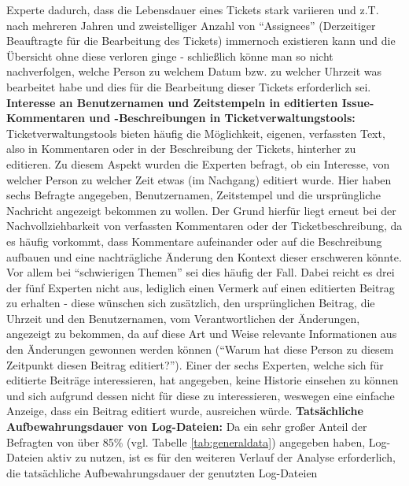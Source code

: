 Experte dadurch, dass die Lebensdauer eines Tickets stark variieren und z.T. nach mehreren Jahren und zweistelliger Anzahl von \enquote{Assignees} (Derzeitiger Beauftragte für die Bearbeitung des Tickets) immernoch existieren kann und die Übersicht ohne diese verloren ginge - schließlich könne man so nicht nachverfolgen, welche Person zu welchem Datum bzw. zu welcher Uhrzeit 
was bearbeitet habe und dies für die Bearbeitung dieser Tickets erforderlich sei. \newline \newline
\textbf{Interesse an Benutzernamen und Zeitstempeln in editierten Issue-Kommentaren und -Beschreibungen in Ticketverwaltungstools:} \newline
Ticketverwaltungstools bieten häufig die Möglichkeit, eigenen, verfassten Text, also in Kommentaren oder in der Beschreibung der Tickets, hinterher zu editieren. Zu diesem Aspekt wurden die Experten befragt, ob ein Interesse, von welcher Person zu welcher Zeit etwas (im Nachgang) editiert wurde. Hier haben sechs Befragte angegeben, Benutzernamen, Zeitstempel und die ursprüngliche Nachricht
angezeigt bekommen zu wollen. Der Grund hierfür liegt erneut bei der Nachvollziehbarkeit von verfassten Kommentaren oder der Ticketbeschreibung, da es häufig vorkommt, dass Kommentare aufeinander oder auf die Beschreibung aufbauen und eine nachträgliche Änderung den Kontext dieser erschweren könnte. Vor allem bei \enquote{schwierigen Themen} sei dies häufig der Fall. Dabei reicht es drei der
fünf Experten nicht aus, lediglich einen Vermerk auf einen editierten Beitrag zu erhalten - diese wünschen sich zusätzlich, den ursprünglichen Beitrag, die Uhrzeit und den Benutzernamen, vom Verantwortlichen der Änderungen, angezeigt zu bekommen, da auf diese Art und Weise relevante Informationen aus den Änderungen gewonnen werden können (\enquote{Warum hat diese Person zu diesem Zeitpunkt diesen Beitrag
editiert?}). Einer der sechs Experten, welche sich für editierte Beiträge interessieren, hat angegeben, keine Historie einsehen zu können und sich aufgrund dessen nicht für diese zu interessieren, weswegen eine einfache Anzeige, dass ein Beitrag editiert wurde, ausreichen würde. \newline \newline
\textbf{Tatsächliche Aufbewahrungsdauer von Log-Dateien:} \newline
Da ein sehr großer Anteil der Befragten von über 85\% (vgl. Tabelle \ref{tab:generaldata}) angegeben haben, Log-Dateien aktiv zu nutzen, ist es für den weiteren Verlauf der Analyse erforderlich, die tatsächliche Aufbewahrungsdauer der genutzten Log-Dateien 
